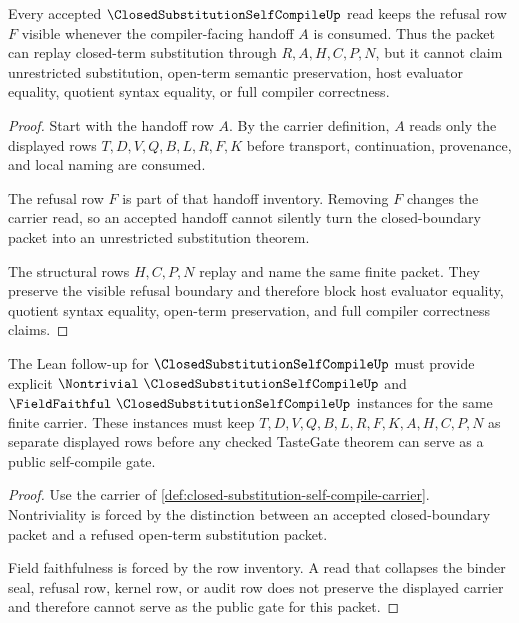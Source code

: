 \begin{theorem}
\label{thm:closed-substitution-self-compile-refusal-boundary}
Every accepted $\ClosedSubstitutionSelfCompileUp$ read keeps the refusal row $F$ visible whenever the compiler-facing handoff $A$ is consumed. Thus the packet can replay closed-term substitution through $R,A,H,C,P,N$, but it cannot claim unrestricted substitution, open-term semantic preservation, host evaluator equality, quotient syntax equality, or full compiler correctness.
\end{theorem}
\begin{proof}
Start with the handoff row $A$. By the carrier definition, $A$ reads only the displayed rows $T,D,V,Q,B,L,R,F,K$ before transport, continuation, provenance, and local naming are consumed.

The refusal row $F$ is part of that handoff inventory. Removing $F$ changes the carrier read, so an accepted handoff cannot silently turn the closed-boundary packet into an unrestricted substitution theorem.

The structural rows $H,C,P,N$ replay and name the same finite packet. They preserve the visible refusal boundary and therefore block host evaluator equality, quotient syntax equality, open-term preservation, and full compiler correctness claims.
\end{proof}

\begin{theorem}
\label{thm:closed-substitution-self-compile-tastegate-readiness}
The Lean follow-up for $\ClosedSubstitutionSelfCompileUp$ must provide explicit $\Nontrivial\ \ClosedSubstitutionSelfCompileUp$ and $\FieldFaithful\ \ClosedSubstitutionSelfCompileUp$ instances for the same finite carrier. These instances must keep $T,D,V,Q,B,L,R,F,K,A,H,C,P,N$ as separate displayed rows before any checked TasteGate theorem can serve as a public self-compile gate.
\end{theorem}
\begin{proof}
Use the carrier of \autoref{def:closed-substitution-self-compile-carrier}. Nontriviality is forced by the distinction between an accepted closed-boundary packet and a refused open-term substitution packet.

Field faithfulness is forced by the row inventory. A read that collapses the binder seal, refusal row, kernel row, or audit row does not preserve the displayed carrier and therefore cannot serve as the public gate for this packet.
\end{proof}

